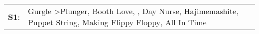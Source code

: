 \begin{supertabular}{p{0.03\textwidth}p{0.92\textwidth}}
 \textbf{S1}:  &  Gurgle\textsuperscript{} \textgreater \enspace Plunger\textsuperscript{}, \enspace Booth Love\textsuperscript{}, \textsuperscript{}, \enspace Day Nurse\textsuperscript{}, \enspace Hajimemashite\textsuperscript{}, \enspace Puppet String\textsuperscript{}, \enspace Making Flippy Floppy\textsuperscript{}, \enspace All In Time\textsuperscript{}  \enspace  \\
\end{supertabular}
